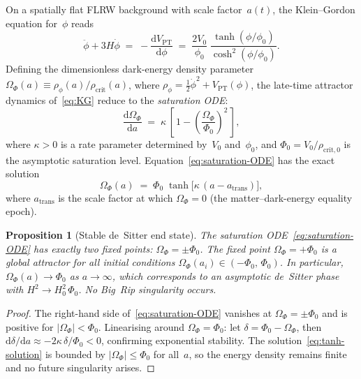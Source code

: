 \documentclass[12pt,a4paper]{article}
\theoremstyle{definition}
\theoremstyle{plain}
\newtheorem{proposition}[definition]{Proposition}
\theoremstyle{remark}
\newcommand{\dd}{\mathrm{d}}
\begin{document}
\medskip
On a spatially flat FLRW background with scale factor~$a(t)$, the
Klein--Gordon equation for~$\phi$ reads
\begin{equation}\label{eq:KG}
  \ddot{\phi} + 3H\dot{\phi}
  \;=\; -\frac{\dd V_{\mathrm{PT}}}{\dd\phi}
  \;=\; \frac{2V_{0}}{\phi_{0}}\;
  \frac{\tanh(\phi/\phi_{0})}{\cosh^{2}(\phi/\phi_{0})}.
\end{equation}
Defining the dimensionless dark-energy density parameter
$\Omega_{\Phi}(a) \equiv \rho_{\phi}(a)/\rho_{\mathrm{crit}}(a)$,
where $\rho_{\phi} = \tfrac{1}{2}\dot{\phi}^{2} + V_{\mathrm{PT}}(\phi)$,
the late-time attractor dynamics of~\eqref{eq:KG} reduce to the
\emph{saturation ODE}:
\begin{equation}\label{eq:saturation-ODE}
  \frac{\dd\Omega_{\Phi}}{\dd a}
  \;=\; \kappa\,
  \left[\,
    1 - \left(\frac{\Omega_{\Phi}}{\Phi_{0}}\right)^{\!2}
  \,\right],
\end{equation}
where $\kappa > 0$ is a rate parameter determined by~$V_{0}$
and~$\phi_{0}$, and $\Phi_{0} = V_{0}/\rho_{\mathrm{crit},0}$ is the
asymptotic saturation level. Equation~\eqref{eq:saturation-ODE} has
the exact solution
\begin{equation}\label{eq:tanh-solution}
  \Omega_{\Phi}(a) \;=\;
  \Phi_{0}\;\tanh\!\bigl[\kappa\,(a - a_{\mathrm{trans}})\bigr],
\end{equation}
where $a_{\mathrm{trans}}$ is the scale factor at which
$\Omega_{\Phi} = 0$ (the matter--dark-energy equality epoch).

\begin{proposition}[Stable de~Sitter end state]\label{prop:saturation}
The saturation ODE~\eqref{eq:saturation-ODE} has exactly two fixed
points: $\Omega_{\Phi} = \pm\Phi_{0}$. The fixed point
$\Omega_{\Phi} = +\Phi_{0}$ is a global attractor for all initial
conditions $\Omega_{\Phi}(a_{i}) \in (-\Phi_{0},\,\Phi_{0})$. In
particular, $\Omega_{\Phi}(a) \to \Phi_{0}$ as $a \to \infty$, which
corresponds to an asymptotic de~Sitter phase with
$H^{2} \to H_{0}^{2}\,\Phi_{0}$. No Big~Rip singularity occurs.
\end{proposition}

\begin{proof}
The right-hand side of~\eqref{eq:saturation-ODE} vanishes at
$\Omega_{\Phi} = \pm\Phi_{0}$ and is positive for
$|\Omega_{\Phi}| < \Phi_{0}$. Linearising around
$\Omega_{\Phi} = \Phi_{0}$: let $\delta = \Phi_{0} - \Omega_{\Phi}$,
then $\dd\delta/\dd a \approx -2\kappa\,\delta/\Phi_{0} < 0$,
confirming exponential stability. The solution~\eqref{eq:tanh-solution}
is bounded by $|\Omega_{\Phi}| \leq \Phi_{0}$ for all~$a$, so the
energy density remains finite and no future singularity arises.
\end{proof}
\end{document}

